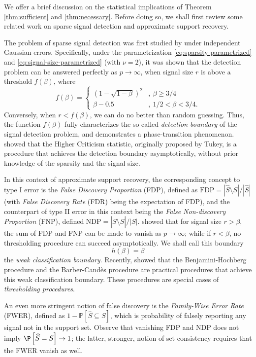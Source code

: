 
We offer a brief discussion on the statistical implications of Theorem \ref{thm:sufficient} and \ref{thm:necessary}.
Before doing so, we shall first review some related work on sparse signal detection and approximate support recovery.

The problem of sparse signal detection was first studied by \citet*{ingster1998minimax} under independent Gaussian errors.
Specifically, under the parametrization \eqref{eq:sparsity-parametrized} and \eqref{eq:signal-size-parametrized} (with $\nu=2$), it was shown that the detection problem can be answered perfectly as $p\to\infty$, when signal size $r$ is above a threshold $f(\beta)$, where
\begin{equation} \label{eq:detection-boundary}
f(\beta) = \begin{cases}
\left(1 - \sqrt{1 - \beta}\right)^2 &,\ \beta\ge3/4\\
\beta - 0.5 &,\ 1/2<\beta<3/4.
\end{cases}
\end{equation}
Conversely, when $r<f(\beta)$, we can do no better than random guessing. 
Thus, the function $f(\beta)$ fully characterizes the so-called \emph{detection boundary} of the signal detection problem, and demonstrates a phase-transition phenomenon. 
\citet*{donoho2004higher} showed that the Higher Criticism statistic, originally proposed by Tukey, is a procedure that achieves the detection boundary asymptotically, without prior knowledge of the sparsity and the signal size.

In this context of approximate support recovery, the corresponding concept to type I error is the \emph{False Discovery Proportion} (FDP), defined as $\text{FDP} = |\widehat{S}\setminus S|\big/|\widehat{S}|$ (with \emph{False Discovery Rate} (FDR) being the expectation of FDP), 
and the counterpart of type II error in this context being the \emph{False Non-discovery Proportion} (FNP), defined $\text{NDP} = |S\setminus\widehat{S}|\big/|S|$.
\citet*{haupt2011distilled} showed that for signal size $r > \beta$, the sum of FDP and FNP can be made to vanish as $p\to\infty$; while if $r < \beta$, no thresholding procedure can succeed asymptotically. We shall call this boundary 
\begin{equation} \label{eq:weak-classification-boundary}
    h(\beta) = \beta
\end{equation}
the \emph{weak classification boundary}. Recently, \citet*{arias2017distribution} showed that the Benjamini-Hochberg procedure \citep*{benjamini1995controlling} and the Barber-Cand{\`e}s procedure \citep*{barber2015controlling} are practical procedures that achieve this weak classification boundary.
These procedures are special cases of \emph{thresholding procedures}.

An even more stringent notion of false discovery is the \emph{Family-Wise Error Rate} (FWER), defined as $1 - \mathbb P[\widehat{S} \subseteq S]$, which is probability of falsely reporting any signal not in the support set.
Observe that vanishing FDP and NDP does not imply $\P\left[\widehat{S} = S\right]\to 1$;
the latter, stronger, notion of set consistency requires that the FWER vanish as well.

